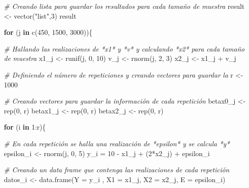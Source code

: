 \documentclass[
]{article}
\newenvironment{Shaded}{\begin{snugshade}}{\end{snugshade}}
\newcommand{\AttributeTok}[1]{\textcolor[rgb]{0.77,0.63,0.00}{#1}}
\newcommand{\CommentTok}[1]{\textcolor[rgb]{0.56,0.35,0.01}{\textit{#1}}}
\newcommand{\ControlFlowTok}[1]{\textcolor[rgb]{0.13,0.29,0.53}{\textbf{#1}}}
\newcommand{\DecValTok}[1]{\textcolor[rgb]{0.00,0.00,0.81}{#1}}
\newcommand{\FunctionTok}[1]{\textcolor[rgb]{0.00,0.00,0.00}{#1}}
\newcommand{\NormalTok}[1]{#1}
\newcommand{\OtherTok}[1]{\textcolor[rgb]{0.56,0.35,0.01}{#1}}
\newcommand{\SpecialCharTok}[1]{\textcolor[rgb]{0.00,0.00,0.00}{#1}}
\newcommand{\StringTok}[1]{\textcolor[rgb]{0.31,0.60,0.02}{#1}}
\begin{document}
\begin{Shaded}
\begin{Highlighting}[]
\CommentTok{\# Creando lista para guardar los resultados para cada tamaño de muestra}
\NormalTok{result }\OtherTok{\textless{}{-}} \FunctionTok{vector}\NormalTok{(}\StringTok{"list"}\NormalTok{,}\DecValTok{3}\NormalTok{)}
\NormalTok{result}

\ControlFlowTok{for}\NormalTok{ (j }\ControlFlowTok{in} \FunctionTok{c}\NormalTok{(}\DecValTok{450}\NormalTok{, }\DecValTok{1500}\NormalTok{, }\DecValTok{3000}\NormalTok{))\{}
  
\CommentTok{\# Hallando las realizaciones de *x1* y *v* y calculando *x2* para cada tamaño de muestra  }
\NormalTok{  x1\_j }\OtherTok{\textless{}{-}} \FunctionTok{runif}\NormalTok{(j, }\DecValTok{0}\NormalTok{, }\DecValTok{10}\NormalTok{)}
\NormalTok{  v\_j }\OtherTok{\textless{}{-}} \FunctionTok{rnorm}\NormalTok{(j, }\DecValTok{2}\NormalTok{, }\DecValTok{3}\NormalTok{)}
\NormalTok{  x2\_j }\OtherTok{\textless{}{-}}\NormalTok{ x1\_j }\SpecialCharTok{+}\NormalTok{ v\_j}
  
\CommentTok{\# Definiendo el número de repeticiones y creando vectores para guardar la}
\NormalTok{  r }\OtherTok{\textless{}{-}} \DecValTok{1000}
  
\CommentTok{\# Creando vectores para guardar la información de cada repetición  }
\NormalTok{  betax0\_j }\OtherTok{\textless{}{-}} \FunctionTok{rep}\NormalTok{(}\DecValTok{0}\NormalTok{, r)}
\NormalTok{  betax1\_j }\OtherTok{\textless{}{-}} \FunctionTok{rep}\NormalTok{(}\DecValTok{0}\NormalTok{, r) }
\NormalTok{  betax2\_j }\OtherTok{\textless{}{-}} \FunctionTok{rep}\NormalTok{(}\DecValTok{0}\NormalTok{, r)}

\ControlFlowTok{for}\NormalTok{ (i }\ControlFlowTok{in} \DecValTok{1}\SpecialCharTok{:}\NormalTok{r)\{}

\CommentTok{\# En cada repetición se halla una realización de *epsilon* y se calcula *y*    }
\NormalTok{  epsilon\_i }\OtherTok{\textless{}{-}} \FunctionTok{rnorm}\NormalTok{(j, }\DecValTok{0}\NormalTok{, }\DecValTok{5}\NormalTok{)}
\NormalTok{  y\_i }\OtherTok{=} \DecValTok{10} \SpecialCharTok{{-}}\NormalTok{ x1\_j }\SpecialCharTok{+}\NormalTok{ (}\DecValTok{2}\SpecialCharTok{*}\NormalTok{x2\_j) }\SpecialCharTok{+}\NormalTok{ epsilon\_i}

\CommentTok{\# Creando un data frame que contenga las realizaciones de cada repetición}
\NormalTok{  datos\_i }\OtherTok{\textless{}{-}} \FunctionTok{data.frame}\NormalTok{(}\AttributeTok{Y =}\NormalTok{ y\_i , }\AttributeTok{X1 =}\NormalTok{ x1\_j, }\AttributeTok{X2 =}\NormalTok{ x2\_j, }\AttributeTok{E =}\NormalTok{ epsilon\_i)}


\end{Highlighting}
\end{Shaded}
\end{document}
